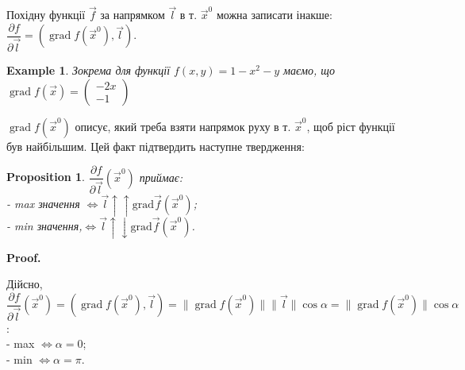 \documentclass[a4paper, 10pt]{article}
\makeatletter
\DeclareMathOperator{\wordgrad}{grad}
\def\departial#1#2{\dfrac{\partial {#1}}{\partial {#2}}}
\def\qed{$\blacksquare$}
\theoremstyle{theoremdd}
\theoremstyle{theoremdd}
\theoremstyle{theoremdd}
\theoremstyle{theoremdd}
\theoremstyle{theoremdd}
\newtheorem{example}[theorem]{Example}
\theoremstyle{theoremdd}
\newtheorem{proposition}[theorem]{Proposition}
\theoremstyle{theoremdd}
\theoremstyle{theoremdd}
\theoremstyle{theoremdd}
\renewenvironment{proof}[1][Proof.\\]{\par
\pushQED{\hfill \qed}%
\normalfont \topsep6\p@\@plus6\p@\relax
\trivlist
\item\relax
{\bfseries
#1\@addpunct{.}}\hspace\labelsep\ignorespaces
}{%
\popQED\endtrivlist\@endpefalse
}
\newcommand\Norm[1]{\lVert#1\rVert}
\makeatother
\begin{document}
Похідну функції $\vec{f}$ за напрямком $\vec{l}$ в т. $\vec{x}^0$ можна записати інакше:\\
$\departial{f}{\vec{l}} = \left( \wordgrad f(\vec{x}^0), \vec{l} \right)$.

\begin{example}
Зокрема для функції $f(x,y) = 1-x^2-y$ маємо, що $\wordgrad f(\vec{x}) = \begin{pmatrix}
-2x \\ -1
\end{pmatrix}$
\end{example}

$\wordgrad f(\vec{x}^0)$ описує, який треба взяти напрямок руху в т. $\vec{x}^0$, щоб ріст функції був найбільшим. Цей факт підтвердить наступне твердження:

\begin{proposition}
$\dfrac{\partial f}{\partial \vec{l}}(\vec{x}^0)$ приймає:\\
- max значення $ \iff \vec{l} \uparrow \uparrow \textrm{grad} \vec{f}(\vec{x}^0)$;\\
- min значення,$ \iff \vec{l} \uparrow \downarrow \textrm{grad} \vec{f}(\vec{x}^0)$.
\end{proposition}

\begin{proof}
Дійсно, $\departial{f}{\vec{l}}(\vec{x}^0) = \left( \wordgrad f(\vec{x}^0), \vec{l} \right) = \Norm{\wordgrad f(\vec{x}^0)} \Norm{\vec{l}} \cos \alpha = \Norm{\wordgrad f(\vec{x}^0)} \cos \alpha$:\\
- max $\iff \alpha = 0$;\\
- min $\iff \alpha = \pi$.
\end{proof}
\end{document}
